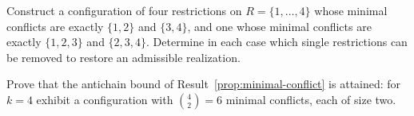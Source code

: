 \begin{exercise}
Construct a configuration of four restrictions on $R=\{1,\dots,4\}$ whose minimal conflicts are exactly $\{1,2\}$ and $\{3,4\}$, and one whose minimal conflicts are exactly $\{1,2,3\}$ and $\{2,3,4\}$. Determine in each case which single restrictions can be removed to restore an admissible realization.
\end{exercise}

\begin{exercise}
Prove that the antichain bound of Result~\ref{prop:minimal-conflict} is attained: for $k=4$ exhibit a configuration with $\binom42=6$ minimal conflicts, each of size two.
\end{exercise}

